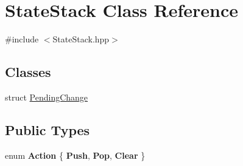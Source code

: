 \hypertarget{classStateStack}{\section{\-State\-Stack \-Class \-Reference}
\label{classStateStack}
}


{\ttfamily \#include $<$\-State\-Stack.\-hpp$>$}

\subsection*{\-Classes}
\begin{DoxyCompactItemize}
\item 
struct \hyperlink{structStateStack_1_1PendingChange}{\-Pending\-Change}
\end{DoxyCompactItemize}
\subsection*{\-Public \-Types}
\begin{DoxyCompactItemize}
\item 
enum {\bfseries \-Action} \{ {\bfseries \-Push}, 
{\bfseries \-Pop}, 
{\bfseries \-Clear}
 \}
\end{DoxyCompactItemize}
